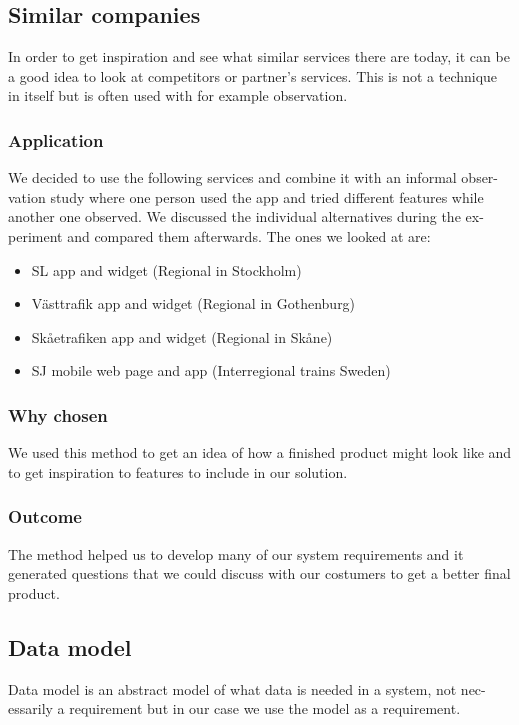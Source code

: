 \documentclass[a4paper]{article}
\begin{document}
    \subsection{Similar companies}
In order to get inspiration and see what similar services there are today, it can be
a good idea to look at competitors or partner’s services. This is not a technique
in itself but is often used with for example observation.

    
    \subsubsection{Application}
We decided to use the following services and combine it with an informal obser-
vation study where one person used the app and tried different features while
another one observed. We discussed the individual alternatives during the ex-
periment and compared them afterwards. The ones we looked at are:
\begin{itemize}
		\item SL app and widget (Regional in Stockholm)
		\item Västtrafik app and widget (Regional in Gothenburg)
		\item Skåetrafiken app and widget (Regional in Skåne)
		\item SJ mobile web page and app (Interregional trains Sweden)
	\end{itemize}
	
    \subsubsection{Why chosen}
We used this method to get an idea of how a finished product might look like
and to get inspiration to features to include in our solution.
    \subsubsection{Outcome}
The method helped us to develop many of our system requirements and it
generated questions that we could discuss with our costumers to get a better
final product.

    \subsection{Data model}
Data model is an abstract model of what data is needed in a system, not nec-
essarily a requirement but in our case we use the model as a requirement.
	
\end{document}
